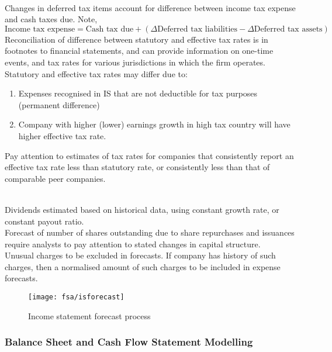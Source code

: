 \begin{remark} \\
Changes in deferred tax items account for difference between income tax expense and cash taxes due. Note,
\begin{equation}
\text{Income tax expense} = \text{Cash tax due} + (\Delta \text{Deferred tax liabilities} - \Delta \text{Deferred tax assets}) \nonumber
\end{equation}
Reconciliation of difference between statutory and effective tax rates is in footnotes to financial statements, and can provide information on one-time events, and tax rates for various jurisdictions in which the firm operates.\\
Statutory and effective tax rates may differ due to:
\begin{enumerate}[label=\roman*.]
\setlength{\itemsep}{0pt}
\item Expenses recognised in IS that are not deductible for tax purposes (permanent difference)
\item Company with higher (lower) earnings growth in high tax country will have higher effective tax rate.
\end{enumerate}
Pay attention to estimates of tax rates for companies that consistently report an effective tax rate less than statutory rate, or consistently less than that of comparable peer companies.
\end{remark}

\begin{remark} \\
Dividends estimated based on historical data, using constant growth rate, or constant payout ratio.\\
Forecast of number of shares outstanding due to share repurchases and issuances require analysts to pay attention to stated changes in capital structure.\\
Unusual charges to be excluded in forecasts. If company has history of such charges, then a normalised amount of such charges to be included in expense forecasts.
\end{remark}

\begin{figure}[H]
\centering
\texttt{[image: fsa/isforecast]}
\caption{Income statement forecast process}
\end{figure}

\subsubsection{Balance Sheet and Cash Flow Statement Modelling}

